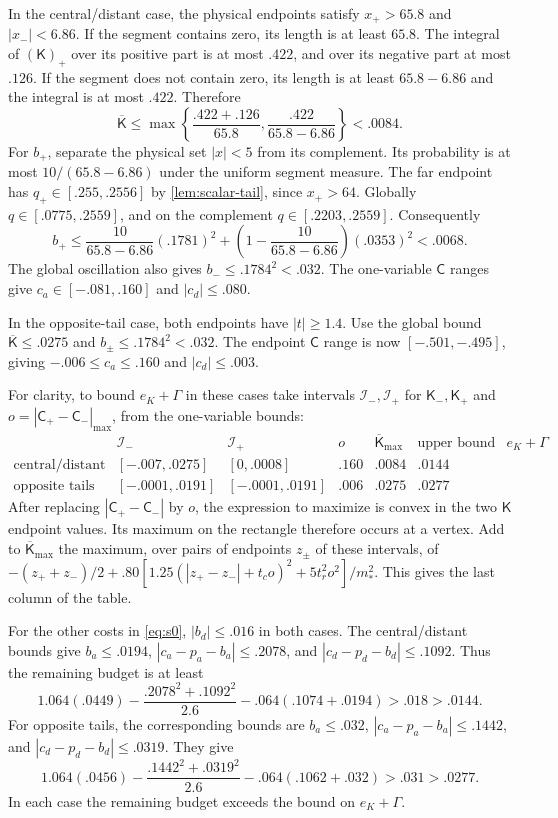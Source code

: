In the central/distant case, the physical endpoints satisfy $x_+>65.8$ and $|x_-|<6.86$. If the segment contains zero, its length is at least $65.8$. The integral of $(\mathsf K)_+$ over its positive part is at most $.422$, and over its negative part at most $.126$. If the segment does not contain zero, its length is at least $65.8-6.86$ and the integral is at most $.422$. Therefore
\[
 \overline{\mathsf K}
 \le\max\left\{\frac{.422+.126}{65.8},
                    \frac{.422}{65.8-6.86}\right\}<.0084.
\]
For $b_+$, separate the physical set $|x|<5$ from its complement. Its probability is at most $10/(65.8-6.86)$ under the uniform segment measure. The far endpoint has $q_+\in[.255,.2556]$ by \cref{lem:scalar-tail}, since $x_+>64$. Globally $q\in[.0775,.2559]$, and on the complement $q\in[.2203,.2559]$. Consequently
\[
 b_+\le\frac{10}{65.8-6.86}(.1781)^2
       +\left(1-\frac{10}{65.8-6.86}\right)(.0353)^2<.0068.
\]
The global oscillation also gives $b_-\le.1784^2<.032$. The one-variable $\mathsf C$ ranges give $c_a\in[-.081,.160]$ and $|c_d|\le.080$.

In the opposite-tail case, both endpoints have $|t|\ge1.4$. Use the global bound $\overline{\mathsf K}\le.0275$ and $b_\pm\le.1784^2<.032$. The endpoint $\mathsf C$ range is now $[-.501,-.495]$, giving $-.006\le c_a\le.160$ and $|c_d|\le.003$.

For clarity, to bound $e_K+\Gamma$ in these cases take intervals $\mathcal{I}_-,\mathcal{I}_+$ for $\mathsf K_-,\mathsf K_+$ and $o=|\mathsf C_+-\mathsf C_-|_{\max}$, from the one-variable bounds:
\[
 \begin{array}{c|ccc|cc}
 &\mathcal{I}_- &\mathcal{I}_+&o&\overline{\mathsf K}_{\max}
 &\text{upper bound on }e_K+\Gamma\\\hline
 \text{central/distant} &[-.007,.0275]&[0,.0008]&.160&.0084&.0144\\
 \text{opposite tails} &[-.0001,.0191]&[-.0001,.0191]&.006&.0275&.0277
 \end{array}
\]
After replacing $|\mathsf C_+-\mathsf C_-|$ by $o$, the expression to maximize is convex in the two $\mathsf K$ endpoint values. Its maximum on the rectangle therefore occurs at a vertex. Add to $\overline{\mathsf K}_{\max}$ the maximum, over pairs of endpoints $z_\pm$ of these intervals, of $-(z_++z_-)/2+.80[1.25(|z_+-z_-|+t_co)^2+5t_r^2o^2]/m_*^2$. This gives the last column of the table.

For the other costs in \eqref{eq:s0}, $|b_d|\le.016$ in both cases. The central/distant bounds give $b_a\le.0194$, $|c_a-p_a-b_a|\le.2078$, and $|c_d-p_d-b_d|\le.1092$. Thus the remaining budget is at least
\[
 1.064(.0449)-\frac{.2078^2+.1092^2}{2.6}
              -.064(.1074+.0194)>.018>.0144.
\]
For opposite tails, the corresponding bounds are $b_a\le.032$, $|c_a-p_a-b_a|\le.1442$, and $|c_d-p_d-b_d|\le.0319$. They give
\[
 1.064(.0456)-\frac{.1442^2+.0319^2}{2.6}
              -.064(.1062+.032)>.031>.0277.
\]
In each case the remaining budget exceeds the bound on $e_K+\Gamma$.

